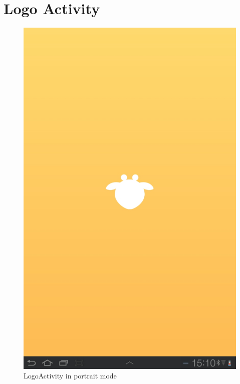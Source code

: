 \section{Logo Activity}
\begin{figure}[h!]
	\centering
	\includegraphics[scale=0.3]{gfx/logo-activity_1.jpg}
	\caption{LogoActivity in portrait mode}
	\label{fig:logo-activity_1}
\end{figure}


